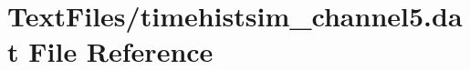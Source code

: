 \hypertarget{TextFiles_2timehistsim__channel5_8dat}{}\section{Text\+Files/timehistsim\+\_\+channel5.dat File Reference}
\label{TextFiles_2timehistsim__channel5_8dat}
